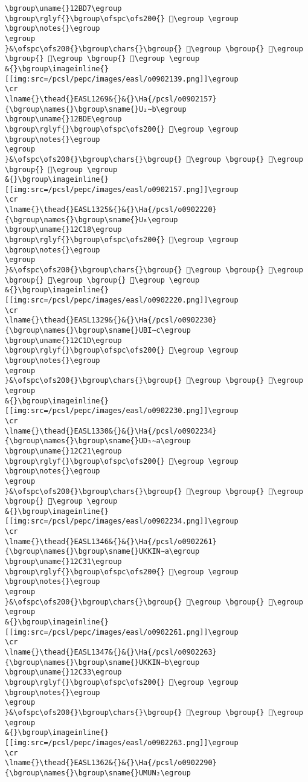 \begin{verbatim}
\bgroup\uname{}12BD7\egroup
\bgroup\rglyf{}\bgroup\ofspc\ofs200{} 𒯗\egroup \egroup
\bgroup\notes{}\egroup
\egroup
}&\ofspc\ofs200{}\bgroup\chars{}\bgroup{} 𒯓\egroup \bgroup{} 𒯕\egroup \bgroup{} 𒯖\egroup \bgroup{} 𒯗\egroup \egroup
&{}\bgroup\imageinline{}[[img:src=/pcsl/pepc/images/easl/o0902139.png]]\egroup
\cr
\lname{}\thead{}EASL1269&{}&{}\Ha{/pcsl/o0902157}{\bgroup\names{}\bgroup\sname{}U₂∼b\egroup
\bgroup\uname{}12BDE\egroup
\bgroup\rglyf{}\bgroup\ofspc\ofs200{} 𒯞\egroup \egroup
\bgroup\notes{}\egroup
\egroup
}&\ofspc\ofs200{}\bgroup\chars{}\bgroup{} 𒯝\egroup \bgroup{} 𒯞\egroup \bgroup{} 𒯟\egroup \egroup
&{}\bgroup\imageinline{}[[img:src=/pcsl/pepc/images/easl/o0902157.png]]\egroup
\cr
\lname{}\thead{}EASL1325&{}&{}\Ha{/pcsl/o0902220}{\bgroup\names{}\bgroup\sname{}U₈\egroup
\bgroup\uname{}12C18\egroup
\bgroup\rglyf{}\bgroup\ofspc\ofs200{} 𒰘\egroup \egroup
\bgroup\notes{}\egroup
\egroup
}&\ofspc\ofs200{}\bgroup\chars{}\bgroup{} 𒰖\egroup \bgroup{} 𒰘\egroup \bgroup{} 𒰙\egroup \bgroup{} 𒰚\egroup \egroup
&{}\bgroup\imageinline{}[[img:src=/pcsl/pepc/images/easl/o0902220.png]]\egroup
\cr
\lname{}\thead{}EASL1329&{}&{}\Ha{/pcsl/o0902230}{\bgroup\names{}\bgroup\sname{}UBI∼c\egroup
\bgroup\uname{}12C1D\egroup
\bgroup\rglyf{}\bgroup\ofspc\ofs200{} 𒰝\egroup \egroup
\bgroup\notes{}\egroup
\egroup
}&\ofspc\ofs200{}\bgroup\chars{}\bgroup{} 𒰝\egroup \bgroup{} 𒰞\egroup \egroup
&{}\bgroup\imageinline{}[[img:src=/pcsl/pepc/images/easl/o0902230.png]]\egroup
\cr
\lname{}\thead{}EASL1330&{}&{}\Ha{/pcsl/o0902234}{\bgroup\names{}\bgroup\sname{}UD₅∼a\egroup
\bgroup\uname{}12C21\egroup
\bgroup\rglyf{}\bgroup\ofspc\ofs200{} 𒰡\egroup \egroup
\bgroup\notes{}\egroup
\egroup
}&\ofspc\ofs200{}\bgroup\chars{}\bgroup{} 𒰟\egroup \bgroup{} 𒰡\egroup \bgroup{} 𒰢\egroup \egroup
&{}\bgroup\imageinline{}[[img:src=/pcsl/pepc/images/easl/o0902234.png]]\egroup
\cr
\lname{}\thead{}EASL1346&{}&{}\Ha{/pcsl/o0902261}{\bgroup\names{}\bgroup\sname{}UKKIN∼a\egroup
\bgroup\uname{}12C31\egroup
\bgroup\rglyf{}\bgroup\ofspc\ofs200{} 𒰱\egroup \egroup
\bgroup\notes{}\egroup
\egroup
}&\ofspc\ofs200{}\bgroup\chars{}\bgroup{} 𒰲\egroup \bgroup{} 𒰱\egroup \egroup
&{}\bgroup\imageinline{}[[img:src=/pcsl/pepc/images/easl/o0902261.png]]\egroup
\cr
\lname{}\thead{}EASL1347&{}&{}\Ha{/pcsl/o0902263}{\bgroup\names{}\bgroup\sname{}UKKIN∼b\egroup
\bgroup\uname{}12C33\egroup
\bgroup\rglyf{}\bgroup\ofspc\ofs200{} 𒰳\egroup \egroup
\bgroup\notes{}\egroup
\egroup
}&\ofspc\ofs200{}\bgroup\chars{}\bgroup{} 𒰼\egroup \bgroup{} 𒰳\egroup \egroup
&{}\bgroup\imageinline{}[[img:src=/pcsl/pepc/images/easl/o0902263.png]]\egroup
\cr
\lname{}\thead{}EASL1362&{}&{}\Ha{/pcsl/o0902290}{\bgroup\names{}\bgroup\sname{}UMUN₂\egroup

\end{verbatim}

